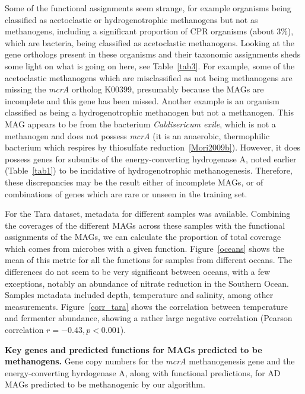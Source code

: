 \documentclass[10pt,letterpaper]{article}
\begin{document}
Some of the functional assignments seem strange, for example organisms being classified as acetoclastic or hydrogenotrophic methanogens but not as methanogens, including a significant proportion of CPR organisms (about 3\%), which are bacteria, being classified as acetoclastic methanogens. Looking at the gene orthologs present in these organisms and their taxonomic assignments sheds some light on what is going on here, see Table~\ref{tab3}. For example, some of the acetoclastic methanogens which are misclassified as not being methanogens are missing the \emph{mcrA} ortholog K00399, presumably because the MAGs are incomplete and this gene has been missed. Another example is an organism classified as being a hydrogenotrophic methanogen but not a methanogen. This MAG appears to be from the bacterium \emph{Caldisericum exile}, which is not a methanogen and does not possess \emph{mcrA} (it is an anaerobic, thermophilic bacterium which respires by thiosulfate reduction~\ref{Mori2009b}). However, it does possess genes for subunits of the energy-converting hydrogenase A, noted earlier (Table~\ref{tab1}) to be incidative of hydrogenotrophic methanogenesis. Therefore, these discrepancies may be the result either of incomplete MAGs, or of combinations of genes which are rare or unseen in the training set.

For the Tara dataset, metadata for different samples was available. Combining the coverages of the different MAGs across these samples with the functional assignments of the MAGs, we can calculate the proportion of total coverage which comes from microbes with a given function. Figure~\ref{oceans} shows the mean of this metric for all the functions for samples from different oceans. The differences do not seem to be very significant between oceans, with a few exceptions, notably an abundance of nitrate reduction in the Southern Ocean. Samples metadata included depth, temperature and salinity, among other measurements. Figure~\ref{corr_tara} shows the correlation between temperature and fermenter abundance, showing a rather large negative correlation (Pearson correlation $r=-0.43, p<0.001$).

\begin{table}
\scriptsize
{}

\caption{{\bf Key genes and predicted functions for MAGs predicted to be methanogens.}
Gene copy numbers for the \emph{mcrA} methanogenesis gene and the energy-converting hyrdogenase A, along with functional predictions, for AD MAGs predicted to be methanogenic by our algorithm.}\label{tab3}
\end{table}
\end{document}
